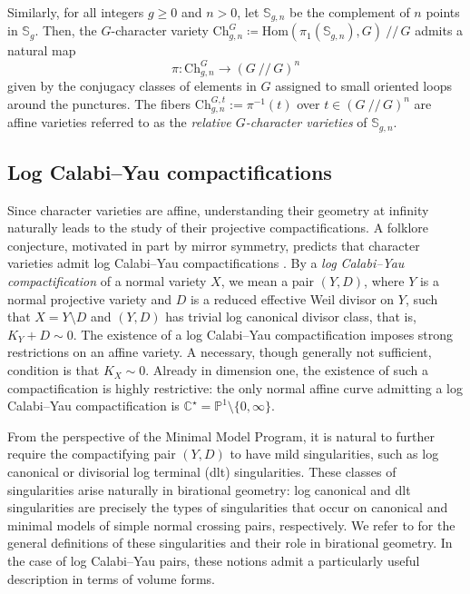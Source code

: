 \documentclass[12pt,letterpaper, reqno]{amsart}
\theoremstyle{defstyle} \newtheorem{definition}[theorem]{Definition}
\theoremstyle{remark}
\numberwithin{equation}{section}
\numberwithin{figure}{section}
\newcommand{\CC} {\mathbb{C}}
\newcommand{\bS} {\mathbb{S}}
\newcommand{\Hom} {\mathrm{Hom}}
\newcommand{\PP} {\mathbb{P}}
\begin{document}
Similarly, for all integers $g\geq 0$ and $n>0$, let $\bS_{g,n}$
be the complement of $n$ points in $\bS_g$. Then, the $G$-character variety $\mathrm{Ch}_{g,n}^G \coloneqq \Hom(\pi_1(\bS_{g,n}), G)\ /\!/\, G$ admits a natural map 
\[ \pi: \mathrm{Ch}_{g,n}^G \longrightarrow (G\ /\!/\, G)^n\]
given by the conjugacy classes of elements in $G$
assigned to small oriented loops around the punctures.
The fibers $\mathrm{Ch}_{g,n}^{G,t}:=\pi^{-1}(t)$ over 
$t \in  (G\ /\!/\, G)^n$ are affine varieties referred to as the \emph{relative $G$-character varieties} of $\bS_{g,n}$.



\subsection{Log Calabi--Yau compactifications}
\label{sec_intro_log_symplectic}

Since character varieties are affine, understanding their geometry at infinity naturally leads to the study of their projective compactifications. A folklore conjecture, motivated in part by mirror symmetry, predicts that character varieties admit log Calabi--Yau compactifications \cite{GHKK, KNPS, KS_WCS, simpson2016dual}. By a \emph{log Calabi--Yau compactification} of a normal variety $X$, we mean a pair $(Y,D)$, where $Y$ is a normal projective variety and $D$ is a reduced effective Weil divisor on $Y$, such that $X=Y \setminus D$ and $(Y,D)$ has trivial log canonical divisor class, that is, $K_Y +D \sim 0$.
The existence of a log Calabi--Yau compactification imposes strong restrictions on an affine variety. A necessary, though generally not sufficient, condition is that $K_X\sim 0$. Already in dimension one, the existence of such a compactification is highly restrictive: the only normal affine curve admitting a log Calabi--Yau compactification is $\CC^\star=\PP^1\setminus\{0,\infty\}$.

From the perspective of the Minimal Model Program, it is natural to further require the compactifying pair $(Y,D)$ to have mild singularities, such as log canonical or divisorial log terminal (dlt) singularities. These classes of singularities arise naturally in birational geometry: log canonical and dlt singularities are precisely the types of singularities that occur on canonical and minimal models of simple normal crossing pairs, respectively. We refer to \cite{kollar2013singularities, KM} for the general definitions of these singularities and their role in birational geometry. In the case of log Calabi--Yau pairs, these notions admit a particularly useful description in terms of volume forms.
\end{document}
